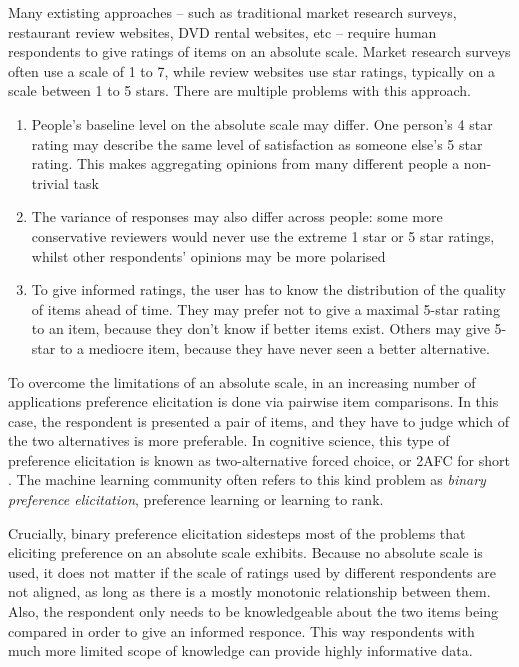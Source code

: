 Many extisting approaches -- such as traditional market research surveys, restaurant review websites, DVD rental websites, etc -- require human respondents to give ratings of items on an absolute scale. Market research surveys often use a scale of 1 to 7, while review websites use star ratings, typically on a scale between 1 to 5 stars. There are multiple problems with this approach.
\begin{enumerate}
	\item People's baseline level on the absolute scale may differ. One person's 4 star rating may describe the same level of satisfaction as someone else's 5 star rating. This makes aggregating opinions from many different people a non-trivial task
	\item The variance of responses may also differ across people: some more conservative reviewers would never use the extreme 1 star or 5 star ratings, whilst other respondents' opinions may be more polarised
	\item To give informed ratings, the user has to know the distribution of the quality of items ahead of time. They may prefer not to give a maximal 5-star rating to an item, because they don't know if better items exist. Others may give 5-star to a mediocre item, because they have never seen a better alternative.
\end{enumerate} 

To overcome the limitations of an absolute scale, in an increasing number of applications preference elicitation is done via pairwise item comparisons. In this case, the respondent is presented a pair of items, and they have to judge which of the two alternatives is more preferable. In cognitive science, this type of preference elicitation is known as two-alternative forced choice, or 2AFC for short \citep{2AFC}. The machine learning community often refers to this kind problem as \emph{binary preference elicitation}, preference learning or learning to rank.

Crucially, binary preference elicitation sidesteps most of the problems that eliciting preference on an absolute scale exhibits. Because no absolute scale is used, it does not matter if the scale of ratings used by different respondents are not aligned, as long as there is a mostly monotonic relationship between them. Also, the respondent only needs to be knowledgeable about the two items being compared in order to give an informed responce. This way respondents with much more limited scope of knowledge can provide highly informative data.

